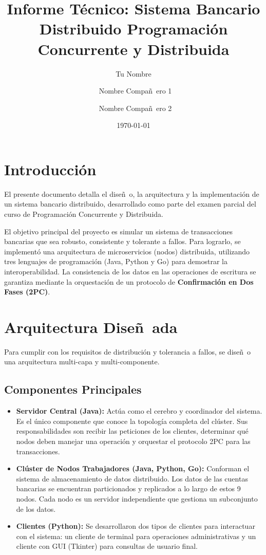 \documentclass[11pt, a4paper]{article}
\title{
    \textbf{Informe Técnico: Sistema Bancario Distribuido}
    \vspace{1cm}
    \large Programaci\'{o}n Concurrente y Distribuida
}
\author{Tu Nombre \and\ Nombre Compa\~n~ero 1 \and\ Nombre Compa\~n~ero 2}
\date{\today}
\begin{document}
\maketitle
\thispagestyle{empty}

\newpage
\tableofcontents
\newpage

\section{Introducci\'{o}n}
El presente documento detalla el dise\~n~o, la arquitectura y la implementaci\'{o}n de un sistema bancario distribuido, desarrollado como parte del examen parcial del curso de Programaci\'{o}n Concurrente y Distribuida. 

El objetivo principal del proyecto es simular un sistema de transacciones bancarias que sea robusto, consistente y tolerante a fallos. Para lograrlo, se implement\'{o} una arquitectura de microservicios (nodos) distribuida, utilizando tres lenguajes de programaci\'{o}n (Java, Python y Go) para demostrar la interoperabilidad. La consistencia de los datos en las operaciones de escritura se garantiza mediante la orquestaci\'{o}n de un protocolo de \textbf{Confirmaci\'{o}n en Dos Fases (2PC)}.

\section{Arquitectura Dise\~n~ada}
Para cumplir con los requisitos de distribuci\'{o}n y tolerancia a fallos, se dise\~n~o una arquitectura multi-capa y multi-componente.

\subsection{Componentes Principales}
\begin{itemize}
    \item \textbf{Servidor Central (Java):} Act\'{u}a como el cerebro y coordinador del sistema. Es el \'{u}nico componente que conoce la topolog\'{i}a completa del cl\'{u}ster. Sus responsabilidades son recibir las peticiones de los clientes, determinar qu\'{e} nodos deben manejar una operaci\'{o}n y orquestar el protocolo 2PC para las transacciones. 
    
    \item \textbf{Cl\'{u}ster de Nodos Trabajadores (Java, Python, Go):} Conforman el sistema de almacenamiento de datos distribuido. Los datos de las cuentas bancarias se encuentran particionados y replicados a lo largo de estos 9 nodos. Cada nodo es un servidor independiente que gestiona un subconjunto de los datos.
    
    \item \textbf{Clientes (Python):} Se desarrollaron dos tipos de clientes para interactuar con el sistema: un cliente de terminal para operaciones administrativas y un cliente con GUI (Tkinter) para consultas de usuario final.
\end{itemize}
\end{document}
